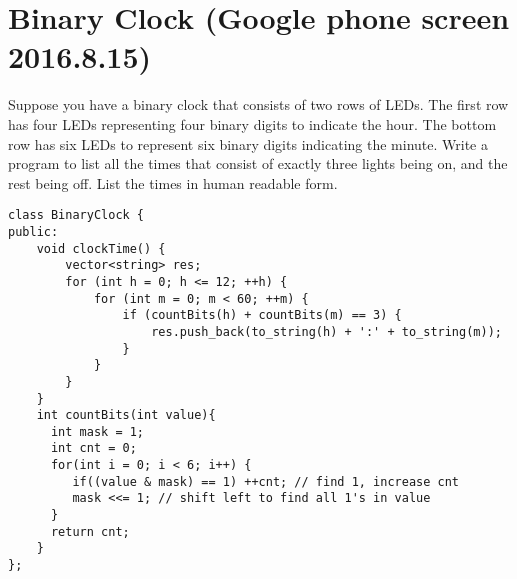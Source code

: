 \section{Binary Clock (Google phone screen 2016.8.15)}
Suppose you have a binary clock that consists of two rows of LEDs. The first row has four LEDs representing four binary digits to indicate the hour. The bottom row has six LEDs to represent six binary digits indicating the minute. Write a program to list all the times that consist of exactly three lights being on, and the rest being off. List the times in human readable form.\\

\begin{lstlisting}
class BinaryClock {
public:
    void clockTime() {
        vector<string> res;
        for (int h = 0; h <= 12; ++h) {
            for (int m = 0; m < 60; ++m) {
                if (countBits(h) + countBits(m) == 3) {
                    res.push_back(to_string(h) + ':' + to_string(m));
                }
            }
        }
    }
    int countBits(int value){
      int mask = 1;
      int cnt = 0;
      for(int i = 0; i < 6; i++) {
         if((value & mask) == 1) ++cnt; // find 1, increase cnt
         mask <<= 1; // shift left to find all 1's in value
      }
      return cnt;       
    }
};
\end{lstlisting}